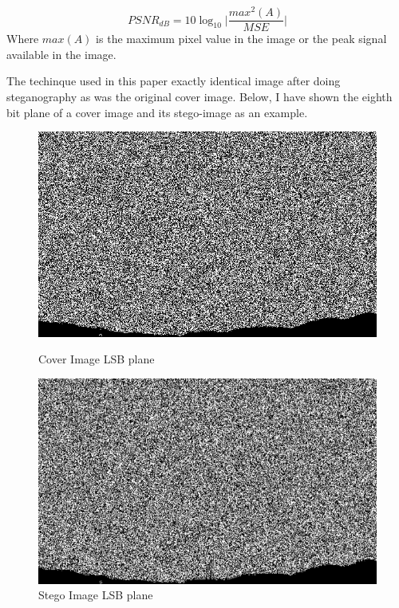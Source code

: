 \documentclass{report}
\begin{document}
\begin{equation}
PSNR_{dB} = 10 \log_{10}\Bigg|\frac{max^{2}(A)}{MSE}\Bigg|
\end{equation}
Where $max(A)$ is the maximum pixel value in the image or the peak signal available in the image. \par The techinque used in this paper exactly identical image after doing steganography as was the original cover image. Below, I have shown the eighth bit plane of a cover image and its stego-image as an example.
\begin{figure}[H]
\centering
\begin{minipage}{0.46\linewidth}
\includegraphics[width=\textwidth]{images/konsole.png}
\caption{Cover Image LSB plane}
\end{minipage}
\hfill
\begin{minipage}{0.46\linewidth}
\includegraphics[width=\textwidth]{images/konsole-stego.png}
\caption{Stego Image LSB plane}
\end{minipage}
\end{figure}
\end{document}
